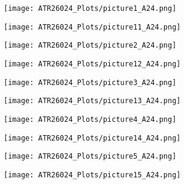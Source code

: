 \begin{figure}[H]
	\centering
	\begin{subfigure}[b]{0.45\textwidth}
		\texttt{[image: ATR26024\_Plots/picture1\_A24.png]}
	\end{subfigure}
	\hfill
	\begin{subfigure}[b]{0.45\textwidth}
		\texttt{[image: ATR26024\_Plots/picture11\_A24.png]}
	\end{subfigure}
\end{figure}

\begin{figure}[H]
	\centering
	\begin{subfigure}[b]{0.45\textwidth}
		\texttt{[image: ATR26024\_Plots/picture2\_A24.png]}
	\end{subfigure}
	\hfill
	\begin{subfigure}[b]{0.45\textwidth}
		\texttt{[image: ATR26024\_Plots/picture12\_A24.png]}
	\end{subfigure}
\end{figure}

\begin{figure}[H]
	\centering
	\begin{subfigure}[b]{0.45\textwidth}
		\texttt{[image: ATR26024\_Plots/picture3\_A24.png]}
	\end{subfigure}
	\hfill
	\begin{subfigure}[b]{0.45\textwidth}
		\texttt{[image: ATR26024\_Plots/picture13\_A24.png]}
	\end{subfigure}
\end{figure}

\begin{figure}[H]
	\centering
	\begin{subfigure}[b]{0.45\textwidth}
		\texttt{[image: ATR26024\_Plots/picture4\_A24.png]}
	\end{subfigure}
	\hfill
	\begin{subfigure}[b]{0.45\textwidth}
		\texttt{[image: ATR26024\_Plots/picture14\_A24.png]}
	\end{subfigure}
\end{figure}

\begin{figure}[H]
	\centering
	\begin{subfigure}[b]{0.45\textwidth}
		\texttt{[image: ATR26024\_Plots/picture5\_A24.png]}
	\end{subfigure}
	\hfill
	\begin{subfigure}[b]{0.45\textwidth}
		\texttt{[image: ATR26024\_Plots/picture15\_A24.png]}
	\end{subfigure}
\end{figure}

